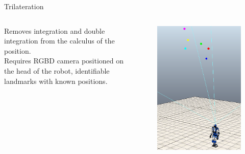 \documentclass[10pt]{beamer}
\begin{document}
    \begin{frame}[fragile]{Trilateration}
        \begin{columns}[c,onlytextwidth]
                    {\small
                        Removes integration and double integration from the calculus of
                        the position.\\
                        \vspace{0.25cm}
                        Requires RGBD camera positioned on the head of the robot,
                        identifiable landmarks with known positions.}
                \begin{figure}
                    \includegraphics[width=\textwidth,right]{images/rgbd-tril-1.png}
                \end{figure}
        \end{columns}
    \end{frame}
\end{document}
